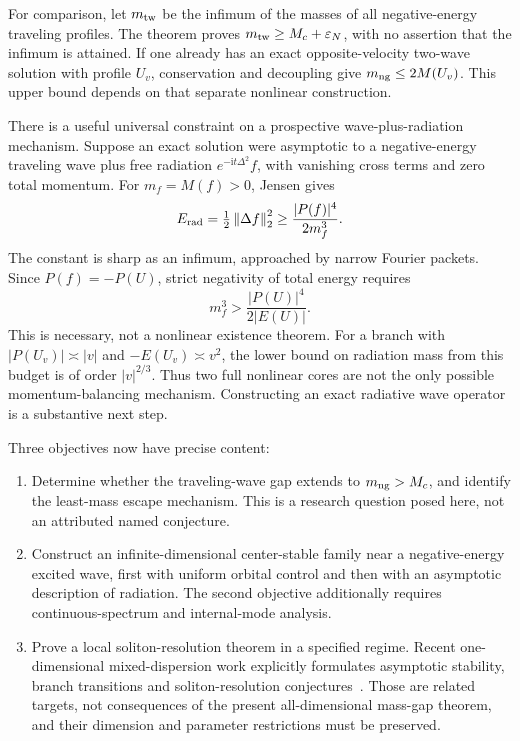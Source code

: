 \documentclass[11pt,a4paper]{article}
\theoremstyle{remark}\newtheorem{remark}[theorem]{Remark}
\newcommand{\ii}{\mathrm i}\newcommand{\dd}{\,\mathrm d}
\newcommand{\norm}[1]{\left\|#1\right\|}
\begin{document}
For comparison, let $m_{\rm tw}$ be the infimum of the masses of all negative-energy traveling profiles. The theorem proves $m_{\rm tw}\ge M_c+\varepsilon_N$, with no assertion that the infimum is attained. If one already has an exact opposite-velocity two-wave solution with profile $U_v$, conservation and decoupling give $m_{\rm ng}\le2M(U_v)$. This upper bound depends on that separate nonlinear construction.

There is a useful universal constraint on a prospective wave-plus-radiation mechanism. Suppose an exact solution were asymptotic to a negative-energy traveling wave plus free radiation $e^{-\ii t\Delta^2}f$, with vanishing cross terms and zero total momentum. For $m_f=M(f)>0$, Jensen gives
\[
 E_{\rm rad}=\tfrac12\norm{\Delta f}_2^2
 \ge\frac{|P(f)|^4}{2m_f^3}.
\]
The constant is sharp as an infimum, approached by narrow Fourier packets. Since $P(f)=-P(U)$, strict negativity of total energy requires
\begin{equation}\label{eq:budget}
 m_f^3>\frac{|P(U)|^4}{2|E(U)|}.
\end{equation}
This is necessary, not a nonlinear existence theorem. For a branch with $|P(U_v)|\asymp|v|$ and $-E(U_v)\asymp v^2$, the lower bound on radiation mass from this budget is of order $|v|^{2/3}$. Thus two full nonlinear cores are not the only possible momentum-balancing mechanism. Constructing an exact radiative wave operator is a substantive next step.

Three objectives now have precise content:
\begin{enumerate}[leftmargin=*,itemsep=3pt]
 \item Determine whether the traveling-wave gap extends to $m_{\rm ng}>M_c$, and identify the least-mass escape mechanism. This is a research question posed here, not an attributed named conjecture.
 \item Construct an infinite-dimensional center-stable family near a negative-energy excited wave, first with uniform orbital control and then with an asymptotic description of radiation. The second objective additionally requires continuous-spectrum and internal-mode analysis.
 \item Prove a local soliton-resolution theorem in a specified regime. Recent one-dimensional mixed-dispersion work explicitly formulates asymptotic stability, branch transitions and soliton-resolution conjectures~\cite{KPRS}. Those are related targets, not consequences of the present all-dimensional mass-gap theorem, and their dimension and parameter restrictions must be preserved.
\end{enumerate}
\end{document}
